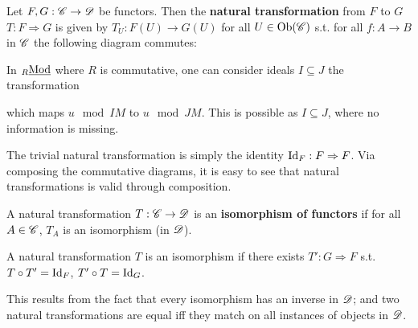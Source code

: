 \begin{definition}
    Let $F, G: \mathscr{C} \to \mathscr{D}$ be functors. Then the \textbf{natural transformation} from $F$ to $G$ $T: F \Rightarrow G$ is given by $T_U: F(U) \to G(U)$ for all $U \in \mathrm{Ob}(\mathscr{C})$ s.t. for all $f: A \to B$ in $\mathscr{C}$ the following diagram commutes:
    \begin{figure}[htbp]
        \centering
    \end{figure}
\end{definition}

\begin{example}
    In ${}_{R}\underline{\textup{Mod}}$ where $R$ is commutative, one can consider ideals $I \subseteq J$ the transformation
    \begin{figure}[htbp]
        \centering
    \end{figure}
    which maps $u \mod{IM}$ to $u \mod{JM}$. This is possible as $I \subseteq J$, where no information is missing.
\end{example}

\begin{remark}
    The trivial natural transformation is simply the identity $\mathrm{Id}_F: F \Rightarrow F$. Via composing the commutative diagrams, it is easy to see that natural transformations is valid through composition.
\end{remark}

\begin{definition}
    A natural transformation $T: \mathscr{C} \to \mathscr{D}$ is an \textbf{isomorphism of functors} if for all $A \in \mathscr{C}$, $T_A$ is an isomorphism (in $\mathscr{D}$). 
\end{definition}

\begin{remark}
    A natural transformation $T$ is an isomorphism if there exists $T': G \Rightarrow F$ s.t. $T \circ T' = \mathrm{Id}_F$, $T' \circ T = \mathrm{Id}_G$.

    This results from the fact that every isomorphism has an inverse in $\mathscr{D}$; and two natural transformations are equal iff they match on all instances of objects in $\mathscr{D}$.
\end{remark}

